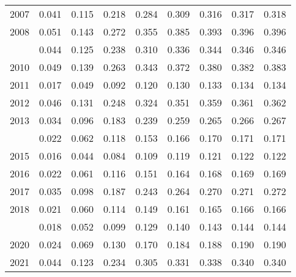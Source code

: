 \documentclass[
]{article}
\begin{document}
\begin{longtable}[t]{lrrrrrrrr}
2007 & 0.041 & 0.115 & 0.218 & 0.284 & 0.309 & 0.316 & 0.317 & 0.318\\
2008 & 0.051 & 0.143 & 0.272 & 0.355 & 0.385 & 0.393 & 0.396 & 0.396\\
\addlinespace
2009 & 0.044 & 0.125 & 0.238 & 0.310 & 0.336 & 0.344 & 0.346 & 0.346\\
2010 & 0.049 & 0.139 & 0.263 & 0.343 & 0.372 & 0.380 & 0.382 & 0.383\\
2011 & 0.017 & 0.049 & 0.092 & 0.120 & 0.130 & 0.133 & 0.134 & 0.134\\
2012 & 0.046 & 0.131 & 0.248 & 0.324 & 0.351 & 0.359 & 0.361 & 0.362\\
2013 & 0.034 & 0.096 & 0.183 & 0.239 & 0.259 & 0.265 & 0.266 & 0.267\\
\addlinespace
2014 & 0.022 & 0.062 & 0.118 & 0.153 & 0.166 & 0.170 & 0.171 & 0.171\\
2015 & 0.016 & 0.044 & 0.084 & 0.109 & 0.119 & 0.121 & 0.122 & 0.122\\
2016 & 0.022 & 0.061 & 0.116 & 0.151 & 0.164 & 0.168 & 0.169 & 0.169\\
2017 & 0.035 & 0.098 & 0.187 & 0.243 & 0.264 & 0.270 & 0.271 & 0.272\\
2018 & 0.021 & 0.060 & 0.114 & 0.149 & 0.161 & 0.165 & 0.166 & 0.166\\
\addlinespace
2019 & 0.018 & 0.052 & 0.099 & 0.129 & 0.140 & 0.143 & 0.144 & 0.144\\
2020 & 0.024 & 0.069 & 0.130 & 0.170 & 0.184 & 0.188 & 0.190 & 0.190\\
2021 & 0.044 & 0.123 & 0.234 & 0.305 & 0.331 & 0.338 & 0.340 & 0.340\\*
\end{longtable}
\end{document}
